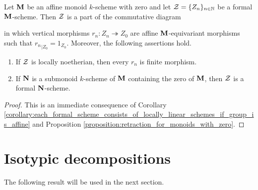 \begin{corollary}\label{corollary:restraction_for_formal_schemes_and_pointed_submonoids}
Let $\mathbf{M}$ be an affine monoid $k$-scheme with zero and let ${\mathcal Z} = \{Z_n\}_{n\in {\mathbb N}}$ be a formal $\mathbf{M}$-scheme. Then ${\mathcal Z}$ is a part of the commutative diagram
\begin{center}
\end{center}
in which vertical morphisms $r_n:Z_n\twoheadrightarrow Z_0$ are affine $\mathbf{M}$-equivariant morphisms such that ${r_n}_{\mid Z_0} = 1_{Z_0}$. Moreover, the following assertions hold.
\begin{enumerate}[label=\emph{\textbf{(\arabic*)}}, leftmargin=3.0em]
\item If ${\mathcal Z}$ is locally noetherian, then every $r_n$ is finite morphism.
\item If $\mathbf{N}$ is a submonoid $k$-scheme of $\mathbf{M}$ containing the zero of $\mathbf{M}$, then ${\mathcal Z}$ is a formal $\mathbf{N}$-scheme.
\end{enumerate}
\end{corollary}
\begin{proof}
This is an immediate consequence of Corollary \ref{corollary:each_formal_scheme_consists_of_locally_linear_schemes_if_group_is_affine} and Proposition \ref{proposition:retraction_for_monoids_with_zero}.
\end{proof}

\section{Isotypic decompositions}
\noindent
The following result will be used in the next section.

